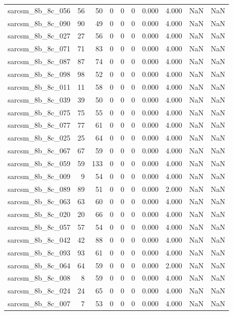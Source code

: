 \documentclass{article}
\begin{document}
\begin{longtable}{lrrrrrrrrr}
sarcsm\_8b\_8c\_056 & 56 & 50 & 0 & 0 & 0 & 0.000 & 4.000 & NaN & NaN \\
sarcsm\_8b\_8c\_090 & 90 & 49 & 0 & 0 & 0 & 0.000 & 4.000 & NaN & NaN \\
sarcsm\_8b\_8c\_027 & 27 & 56 & 0 & 0 & 0 & 0.000 & 4.000 & NaN & NaN \\
sarcsm\_8b\_8c\_071 & 71 & 83 & 0 & 0 & 0 & 0.000 & 4.000 & NaN & NaN \\
sarcsm\_8b\_8c\_087 & 87 & 74 & 0 & 0 & 0 & 0.000 & 4.000 & NaN & NaN \\
sarcsm\_8b\_8c\_098 & 98 & 52 & 0 & 0 & 0 & 0.000 & 4.000 & NaN & NaN \\
sarcsm\_8b\_8c\_011 & 11 & 58 & 0 & 0 & 0 & 0.000 & 4.000 & NaN & NaN \\
sarcsm\_8b\_8c\_039 & 39 & 50 & 0 & 0 & 0 & 0.000 & 4.000 & NaN & NaN \\
sarcsm\_8b\_8c\_075 & 75 & 55 & 0 & 0 & 0 & 0.000 & 4.000 & NaN & NaN \\
sarcsm\_8b\_8c\_077 & 77 & 61 & 0 & 0 & 0 & 0.000 & 4.000 & NaN & NaN \\
sarcsm\_8b\_8c\_025 & 25 & 64 & 0 & 0 & 0 & 0.000 & 4.000 & NaN & NaN \\
sarcsm\_8b\_8c\_067 & 67 & 59 & 0 & 0 & 0 & 0.000 & 4.000 & NaN & NaN \\
sarcsm\_8b\_8c\_059 & 59 & 133 & 0 & 0 & 0 & 0.000 & 4.000 & NaN & NaN \\
sarcsm\_8b\_8c\_009 & 9 & 54 & 0 & 0 & 0 & 0.000 & 4.000 & NaN & NaN \\
sarcsm\_8b\_8c\_089 & 89 & 51 & 0 & 0 & 0 & 0.000 & 2.000 & NaN & NaN \\
sarcsm\_8b\_8c\_063 & 63 & 60 & 0 & 0 & 0 & 0.000 & 4.000 & NaN & NaN \\
sarcsm\_8b\_8c\_020 & 20 & 66 & 0 & 0 & 0 & 0.000 & 4.000 & NaN & NaN \\
sarcsm\_8b\_8c\_057 & 57 & 54 & 0 & 0 & 0 & 0.000 & 4.000 & NaN & NaN \\
sarcsm\_8b\_8c\_042 & 42 & 88 & 0 & 0 & 0 & 0.000 & 4.000 & NaN & NaN \\
sarcsm\_8b\_8c\_093 & 93 & 61 & 0 & 0 & 0 & 0.000 & 4.000 & NaN & NaN \\
sarcsm\_8b\_8c\_064 & 64 & 59 & 0 & 0 & 0 & 0.000 & 2.000 & NaN & NaN \\
sarcsm\_8b\_8c\_008 & 8 & 59 & 0 & 0 & 0 & 0.000 & 4.000 & NaN & NaN \\
sarcsm\_8b\_8c\_024 & 24 & 65 & 0 & 0 & 0 & 0.000 & 4.000 & NaN & NaN \\
sarcsm\_8b\_8c\_007 & 7 & 53 & 0 & 0 & 0 & 0.000 & 4.000 & NaN & NaN \\

\end{longtable}
\end{document}
